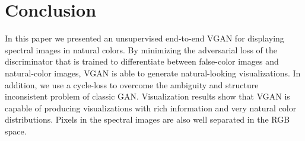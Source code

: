 \documentclass[10pt,conference,a4paper]{IEEEtran}
\begin{document}
\section{Conclusion}
\label{sec:conclusion}
In this paper we presented an unsupervised end-to-end VGAN for displaying spectral images in natural colors.
By minimizing the adversarial loss of the discriminator that is trained to differentiate between false-color images and natural-color images, VGAN is able to generate natural-looking visualizations.
In addition, we use a cycle-loss to overcome the ambiguity and structure inconsistent problem of classic GAN.
Visualization results show that VGAN is capable of producing visualizations with rich information and very natural color distributions.
Pixels in the spectral images are also well separated in the RGB space.










%





\end{document}
